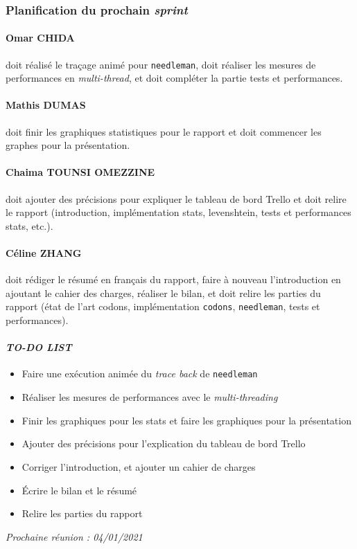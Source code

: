 \subsubsection*{Planification du prochain \textsl{sprint}}
\paragraph*{Omar CHIDA} doit réalisé le traçage animé pour \texttt{needleman}, doit réaliser les mesures de performances en \textsl{multi-thread}, et doit compléter la partie tests et performances.

\paragraph*{Mathis DUMAS} doit finir les graphiques statistiques pour le rapport et doit commencer les graphes pour la présentation.

\paragraph*{Chaima TOUNSI OMEZZINE} doit ajouter des précisions pour expliquer le tableau de bord Trello et doit relire le rapport (introduction, implémentation stats, levenshtein, tests et performances stats, etc.).

\paragraph*{Céline ZHANG} doit rédiger le résumé en français du rapport, faire à nouveau l'introduction en ajoutant le cahier des charges, réaliser le bilan, et doit relire les parties du rapport (état de l'art codons, implémentation \texttt{codons}, \texttt{needleman}, tests et performances).

\paragraph{\emph{TO-DO LIST}}
\begin{itemize}
    \item Faire une exécution animée du \textsl{trace back} de \texttt{needleman}
    \item Réaliser les mesures de performances avec le \textsl{multi-threading}
    \item Finir les graphiques pour les stats et faire les graphiques pour la présentation
    \item Ajouter des précisions pour l'explication du tableau de bord Trello
    \item Corriger l'introduction, et ajouter un cahier de charges
    \item Écrire le bilan et le résumé
    \item Relire les parties du rapport
\end{itemize}

\emph{Prochaine réunion : 04/01/2021}\\

% 